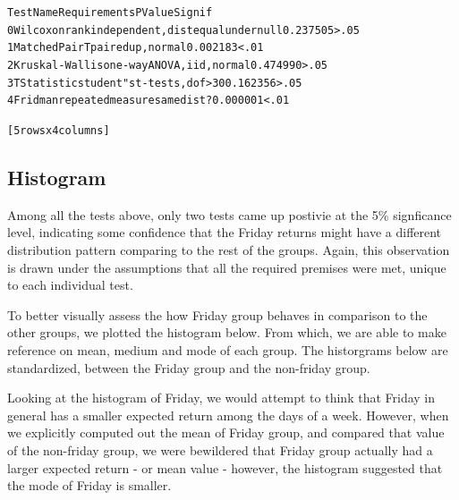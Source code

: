 \documentclass[letterpaper,10pt,english]{/Users/edwsurewin/anaconda/lib/python2.7/site-packages/sphinx/texinputs/sphinxhowto}
\newenvironment{InvisibleVerbatim}
        {\begin{mdframed}[leftmargin=0.1\linewidth,innerleftmargin=3pt,innerrightmargin=3pt, userdefinedwidth=1\linewidth, linewidth=0pt, linecolor=white, usetwoside=false]}
        {\end{mdframed}}
\begin{document}
\fi
    

        
        

            
                \begin{InvisibleVerbatim}
                \vspace{-0.5\baselineskip}
\begin{alltt}        Test Name                        Requirements   P Value Signif
0   Wilcoxon rank  independent, dist equal under null  0.237505   >.05
1  Matched Pair T                   paired up, normal  0.002183   <.01
2  Kruskal-Wallis          one-way ANOVA, iid, normal  0.474990   >.05
3     T Statistic         student"s t-tests, dof > 30  0.162356   >.05
4         Fridman         repeated measure same dist?  0.000001   <.01

[5 rows x 4 columns]
\end{alltt}

            \end{InvisibleVerbatim}
            
        
    
\subsection{Histogram}\label{histogram}

Among all the tests above, only two tests came up postivie at the 5\%
signficance level, indicating some confidence that the Friday returns
might have a different distribution pattern comparing to the rest of the
groups. Again, this observation is drawn under the assumptions that all
the required premises were met, unique to each individual test.

To better visually assess the how Friday group behaves in comparison to
the other groups, we plotted the histogram below. From which, we are
able to make reference on mean, medium and mode of each group. The
historgrams below are standardized, between the Friday group and the
non-friday group.

Looking at the histogram of Friday, we would attempt to think that
Friday in general has a smaller expected return among the days of a
week. However, when we explicitly computed out the mean of Friday group,
and compared that value of the non-friday group, we were bewildered that
Friday group actually had a larger expected return - or mean value -
however, the histogram suggested that the mode of Friday is smaller.
\end{document}

